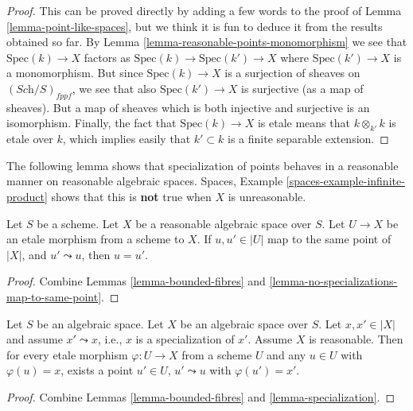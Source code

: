 \begin{proof}
This can be proved directly by adding a few words to the proof of
Lemma \ref{lemma-point-like-spaces},
but we think it is fun to deduce it from the results obtained so far.
By Lemma \ref{lemma-reasonable-points-monomorphism}
we see that $\text{Spec}(k) \to X$ factors as
$\text{Spec}(k) \to \text{Spec}(k') \to X$ where
$\text{Spec}(k') \to X$ is a monomorphism. But since $\text{Spec}(k) \to X$
is a surjection of sheaves on $(\textit{Sch}/S)_{fppf}$, we see that
also $\text{Spec}(k') \to X$ is surjective (as a map of sheaves). But a
map of sheaves which is both injective and surjective is an isomorphism.
Finally, the fact that $\text{Spec}(k) \to X$ is etale means that
$k \otimes_{k'} k$ is etale over $k$, which implies easily that
$k' \subset k$ is a finite separable extension.
\end{proof}

\noindent
The following lemma shows that specialization of points behaves in a
reasonable manner on reasonable algebraic spaces.
Spaces, Example \ref{spaces-example-infinite-product}
shows that this is {\bf not} true when $X$ is unreasonable.

\begin{lemma}
\label{lemma-reasonable-no-specializations-map-to-same-point}
Let $S$ be a scheme.
Let $X$ be a reasonable algebraic space over $S$.
Let $U \to X$ be an etale morphism from a scheme to $X$.
If $u, u' \in |U|$ map to the same point of $|X|$, and
$u' \leadsto u$, then $u = u'$.
\end{lemma}

\begin{proof}
Combine Lemmas \ref{lemma-bounded-fibres} and
\ref{lemma-no-specializations-map-to-same-point}.
\end{proof}

\begin{lemma}
\label{lemma-reasonable-specialization}
Let $S$ be an algebraic space.
Let $X$ be an algebraic space over $S$.
Let $x, x' \in |X|$ and assume $x' \leadsto x$, i.e., $x$ is a
specialization of $x'$.
Assume $X$ is reasonable. Then for every etale morphism
$\varphi : U \to X$ from a scheme $U$ and any $u \in U$ with
$\varphi(u) = x$, exists a point $u'\in U$, $u' \leadsto u$ with
$\varphi(u') = x'$.
\end{lemma}

\begin{proof}
Combine Lemmas \ref{lemma-bounded-fibres} and
\ref{lemma-specialization}.
\end{proof}

